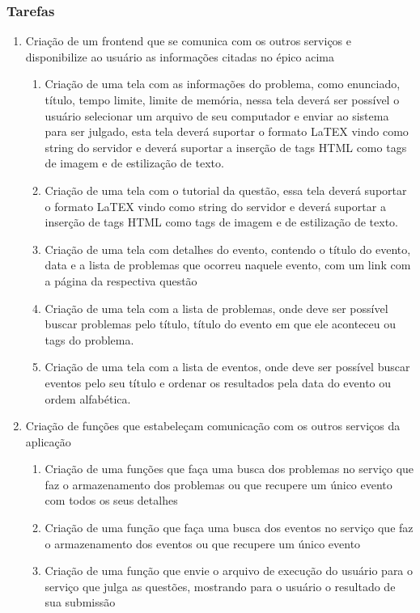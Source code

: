 \subsubsection{Tarefas}
\begin{enumerate}

    \item Criação de um frontend que se comunica com os outros serviços e disponibilize ao usuário 
    as informações citadas no épico acima
          \begin{enumerate}
              \item Criação de uma tela com as informações do problema, como enunciado, título, 
              tempo limite, limite de memória, nessa tela deverá ser possível o usuário selecionar
               um arquivo de seu computador e enviar ao sistema para ser julgado, esta tela deverá
                suportar o formato LaTEX vindo como string do servidor e deverá suportar a inserção
                 de tags HTML como tags de imagem e de estilização de texto.
              \item Criação de uma tela com o tutorial da questão, essa tela deverá suportar o 
              formato LaTEX vindo como string do servidor e deverá suportar a inserção de tags HTML
               como tags de imagem e de estilização de texto.
              \item Criação de uma tela com detalhes do evento, contendo o título do evento, data e
               a lista de problemas que ocorreu naquele evento, com um link com a página da 
               respectiva questão
              \item Criação de uma tela com a lista de problemas, onde deve ser possível buscar 
              problemas pelo título, título do evento em que ele aconteceu ou tags do problema.
              \item Criação de uma tela com a lista de eventos, onde deve ser possível buscar 
              eventos pelo seu título e ordenar os resultados pela data do evento ou ordem
               alfabética.
          \end{enumerate}
    \item Criação de funções que estabeleçam comunicação com os outros serviços da aplicação
          \begin{enumerate}
              \item Criação de uma funções que faça uma busca dos problemas no serviço que faz o 
              armazenamento dos problemas ou que recupere um único evento com todos os seus detalhes
              \item Criação de uma função que faça uma busca dos eventos no serviço que faz o 
              armazenamento dos eventos ou que recupere um único evento
              \item Criação de uma função que envie o arquivo de execução do usuário para o serviço 
              que julga as questões, mostrando para o usuário o resultado de sua submissão
          \end{enumerate}
\end{enumerate}

